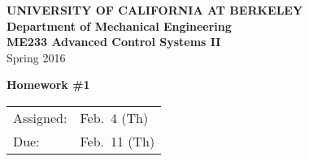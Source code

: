 \documentclass[letterpaper,12pt]{article}
\begin{document}
\begin{center}
    {\bf UNIVERSITY OF CALIFORNIA AT BERKELEY}\\
    {\bf Department of Mechanical Engineering}\\
    {\bf ME233  Advanced Control Systems II}\\
    Spring 2016\\
\end{center}
\noindent
{\Large \bf Homework \#1 }\\[-3em]
\begin{flushright}
\begin{tabular} {l l}
    Assigned: &  Feb.\ 4 (Th)\\
    Due: & Feb.\ 11 (Th)
\end{tabular}
\end{flushright}
\end{document}

